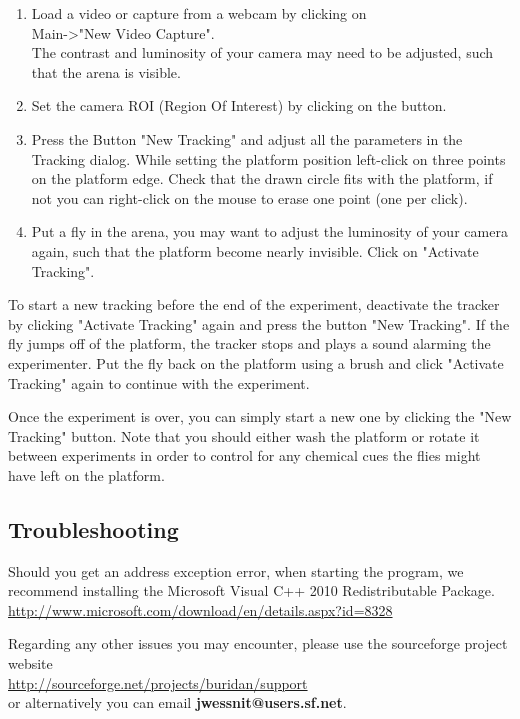 \documentclass[11pt,a4paper]{article}
\begin{document}
\begin{enumerate}
\item Load a video or capture from a webcam by clicking on \\ 
Main->"New Video Capture". \\
The contrast and luminosity of your camera may need to be adjusted, such that the arena is visible.
\item Set the camera ROI (Region Of Interest) by clicking on the button.
\item Press the Button "New Tracking" and adjust all the parameters in the Tracking dialog. While setting the platform position left-click on three points on the platform edge. Check that the drawn circle fits with the platform, if not you can right-click on the mouse to erase one point (one per click).
\item Put a fly in the arena, you may want to adjust the luminosity of your camera again, such that the platform become nearly invisible. Click on "Activate Tracking". 
\end{enumerate}

To start a new tracking before the end of the experiment, deactivate the tracker by clicking "Activate Tracking" again and press the button "New Tracking". If the fly jumps off of the platform, the tracker stops and plays a sound alarming the experimenter. Put the fly back on the platform using a brush and click "Activate Tracking" again to continue with the experiment.

Once the experiment is over, you can simply start a new one by clicking the  "New Tracking" button. Note that you should either wash the platform or rotate it between experiments in order to control for  any chemical cues the flies might have left on the platform.

\subsection{Troubleshooting}

Should you get an address exception error, when starting the program, we recommend installing the Microsoft Visual C++ 2010 Redistributable Package. \\ \url{http://www.microsoft.com/download/en/details.aspx?id=8328}

Regarding any other issues you may encounter, please use the sourceforge project website \\
\url{http://sourceforge.net/projects/buridan/support} \\
or alternatively you can email {\bf jwessnit@users.sf.net}. 
\end{document}

